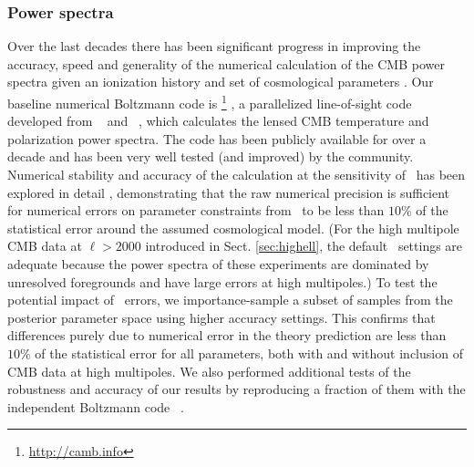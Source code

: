 \subsubsection{Power spectra}

Over the last decades there has been significant progress in improving
the accuracy, speed and generality of the numerical calculation of the
CMB power spectra given an ionization history and set of cosmological
parameters \citep[see e.g.,][]{Bond:87,Sugiyama:95,Ma:1995ey,
Hu:1995fqa,Seljak:1996is,Hu:1997hp,Zaldarriaga:1997va,Lewis:1999bs,
Lesgourgues:2011rh}.
Our baseline
numerical Boltzmann code is \CAMB\footnote{\url{http://camb.info}}
\citep[March 2013;][]{Lewis:1999bs}, a parallelized line-of-sight code
developed from \CMBFAST\ \citep{Seljak:1996is} and \COSMICS\
\citep{Bertschinger:1995er,Ma:1995ey}, which calculates the lensed CMB
temperature and polarization power spectra.  The code has been
publicly available for over a decade and has been very well tested
(and improved) by the community.  Numerical stability and accuracy of
the calculation at the sensitivity of \planck\ has been explored in
detail \citep{Hamann:2009yy,Lesgourgues:2011rg,Howlett:2012mh},
demonstrating that the raw numerical precision is sufficient for
numerical errors on parameter constraints from \planck\ to be less
than $10\%$ of the statistical error around the assumed cosmological
model.  (For the high multipole CMB data at $\ell>2000$ introduced in
Sect. \ref{sec:highell}, the default \CAMB\ settings are adequate
because the power spectra of these experiments are dominated by
unresolved foregrounds and have large errors at high multipoles.)  To
test the potential impact of \CAMB\ errors, we importance-sample a
subset of samples from the posterior parameter space using higher
accuracy settings.  This confirms that differences purely due to
numerical error in the theory prediction are less than $10\%$ of the
statistical error
for all parameters, both with and without inclusion of CMB data at
high multipoles.
We also performed additional tests of the robustness and accuracy of our
 results by reproducing a fraction of them with the independent
 Boltzmann code \CLASS\ \citep{Lesgourgues:2011re,Blas:2011rf}.

